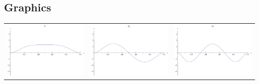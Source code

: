 \documentclass{article}
\begin{document}
\begin{landscape}
\subsection{Graphics}
\begin{tabular}{ccc}
\includegraphics[width=6.7cm]{octic_bspline_1.pdf}& \includegraphics[width=6.7cm]{octic_bspline_2.pdf}& \includegraphics[width=6.7cm]{octic_bspline_3.pdf} \\

\end{tabular}
\end{landscape}
\end{document}
